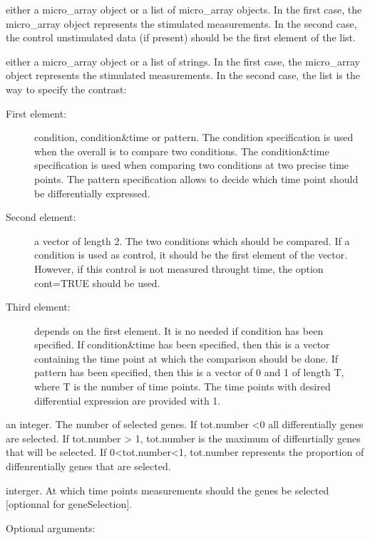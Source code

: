 \documentclass[a4paper]{book}
\begin{document}
\begin{Arguments}
\begin{ldescription}
\item[\code{x}] either a micro\_array object or a list of micro\_array objects. In the first case, the micro\_array object represents the stimulated measurements. In the second case, the control unstimulated data (if present) should be the first element of the list.    
\item[\code{y}] either a micro\_array object or a list of strings. In the first case, the micro\_array object represents the stimulated measurements. In the second case, the list is the way to specify the contrast: \begin{description}

\item[First element:]  condition, condition\&time or pattern. The condition specification is used when the overall is to compare two conditions. 
The condition\&time specification is used when comparing two conditions at two precise time points.
The pattern specification allows to decide which time point should be differentially expressed.
\item[Second element:] a vector of length 2. The two conditions which should be compared. If a condition is used as control, it should be the first element of the vector. However, if this control is not measured throught time, 
the option cont=TRUE should be used.
\item[Third element:] depends on the first element. 
It is no needed if condition has been specified. 
If condition\&time has been specified, then this is a vector containing the time point at which the comparison should be done.
If pattern has been specified, then this is a vector of 0 and 1 of length T, where T is the number of time points. The time points with desired differential expression are provided with 1. 

\end{description}
     
\item[\code{tot.number}] an integer. The number of selected genes. If tot.number <0 all differentially genes are selected. If tot.number > 1, tot.number is the maximum of diffenrtially genes that will be selected. 
If 0<tot.number<1, tot.number represents the proportion of diffenrentially genes that are selected.
\item[\code{peak}] interger. At which time points measurements should the genes be selected [optionnal for geneSelection].
\item[\code{...}] Optional arguments: \begin{description}


\end{description}
\end{ldescription}
\end{Arguments}
\end{document}

